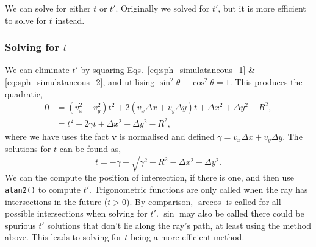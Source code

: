 \documentclass{article}
\let\vec \bm
\begin{document}
We can solve for either $t$ or $t'$. Originally we solved for $t'$, but it is more efficient to solve for $t$ instead.

\subsubsection{Solving for $t$}
We can eliminate $t'$ by squaring Eqs.~\ref{eq:sph_simulataneous_1} \& \ref{eq:sph_simulataneous_2}, and utilising $\sin^2 \theta + \cos^2 \theta = 1$. This produces the quadratic,
\begin{align}
    0
    &=
    (v_x^2 + v_y^2)t^2
    +
    2(v_x \Delta x + v_y \Delta y)t
    +
    \Delta x^2 + \Delta y^2 - R^2, \\
    &=
    t^2
    +
    2 \gamma t
    +
    \Delta x^2 + \Delta y^2 - R^2,
\end{align}
where we have uses the fact $\vec{v}$ is normalised and defined $\gamma = v_x \Delta x + v_y \Delta y$. The solutions for $t$ can be found as,
\begin{equation}
    t
    =
    -\gamma
    \pm
    \sqrt{\gamma^2 + R^2 - \Delta x^2 - \Delta y^2}.
\end{equation}
We can the compute the position of intersection, if there is one, and then use \texttt{atan2()} to compute $t'$. Trigonometric functions are only called when the ray has intersections in the future ($t>0$). By comparison, $\arccos$ is called for all possible intersections when solving for $t'$. $\sin$ may also be called there could be spurious $t'$ solutions that don't lie along the ray's path, at least using the method above. This leads to solving for $t$ being a more efficient method.
\end{document}
